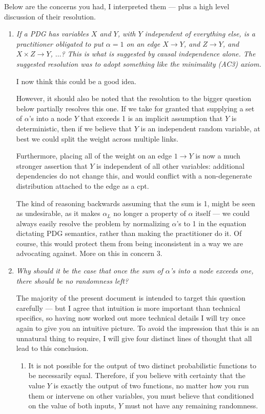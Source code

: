 \documentclass{article}
\theoremstyle{plain}
\theoremstyle{definition}
\theoremstyle{remark}
\begin{document}
Below are the concerns you had, I interpreted them --- plus a high level discussion of their resolution.

\begin{enumerate}[itemsep=1em]
	\item \textit{If a PDG has variables $X$ and $Y$, with $Y$ independent of everything else, is a practitioner obligated to put $\alpha = 1$ on an edge $X \to Y$, and $Z \to Y$, and $X \times Z \to Y$, $\ldots$? This is what is suggested by causal independence alone. The suggested resolution was to adopt something like the minimality (AC3) axiom.}
	
	I now think this could be a good idea. 
	
	However, it should also be noted that the resolution to the bigger question below partially resolves this one. If we take for granted that supplying a set of $\alpha$'s into a node $Y$ that exceeds 1 is an implicit assumption that $Y$ is deterministic, then if we believe that $Y$ is an independent random variable, at best we could split the weight across multiple links. 
	
	Furthermore, placing all of the weight on an edge $1 \to Y$ is now a much stronger assertion that $Y$ is independent of all other variables: additional dependencies do not change this, and would conflict with a non-degenerate distribution attached to the edge as a cpt.

	The kind of reasoning backwards assuming that the sum is 1, might be seen as undesirable, as it makes $\alpha_L$ no longer a property of $\alpha$ itself --- we could always easily resolve the problem by normalizing $\alpha$'s to 1 in the equation dictating PDG semantics, rather than making the practitioner do it. Of course, this would protect them from being inconsistent in a way we are advocating against. More on this in concern 3.
	 
	\item \textit{Why should it be the case that once the sum of $\alpha$'s into a node exceeds one, there should be no randomness left?}
	
	The majority of the present document is intended to target this question carefully --- but I agree that intuition is more important than technical specifics, so having now worked out more technical details I will try once again to give you an intuitive picture. To avoid the impression that this is an unnatural thing to require, I will give four distinct lines of thought that all lead to this conclusion.
	\begin{enumerate}[itemsep=1em]
	\item It is not possible for the output of two distinct probabilistic functions to be necessarily equal. Therefore, if you believe with certainty that the value $Y$ is exactly the output of two functions, no matter how you run them or intervene on other variables, you must believe that conditioned on the value of both inputs, $Y$ must not have any remaining randomness. 
	

\end{enumerate}
\end{enumerate}
\end{document}
